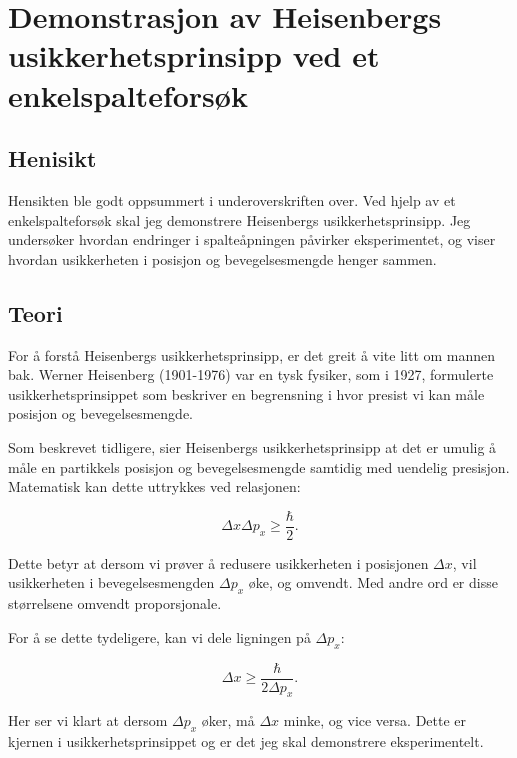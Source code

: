 \documentclass{article}
\begin{document}
\vspace{0.69in}

\section{Demonstrasjon av Heisenbergs usikkerhetsprinsipp ved et enkelspalteforsøk }

\vspace{0.1in}

\subsection{Henisikt}
Hensikten ble godt oppsummert i underoverskriften over. Ved hjelp av et enkelspalteforsøk skal jeg demonstrere Heisenbergs usikkerhetsprinsipp. Jeg undersøker hvordan endringer i spalteåpningen påvirker eksperimentet, og viser hvordan usikkerheten i posisjon og bevegelsesmengde henger sammen.

\vspace{0.2in}

\subsection{Teori}
For å forstå Heisenbergs usikkerhetsprinsipp, er det greit å vite litt om mannen bak. Werner Heisenberg (1901-1976) var en tysk fysiker, som i 1927, formulerte usikkerhetsprinsippet som beskriver en begrensning i hvor presist vi kan måle posisjon og bevegelsesmengde.

Som beskrevet tidligere, sier Heisenbergs usikkerhetsprinsipp at det er umulig å måle en partikkels posisjon og bevegelsesmengde samtidig med uendelig presisjon. Matematisk kan dette uttrykkes ved relasjonen:

\begin{equation*}
    \Delta x \Delta p_x \geq \frac{\hbar}{2}.
\end{equation*}

Dette betyr at dersom vi prøver å redusere usikkerheten i posisjonen $\Delta x$, vil usikkerheten i bevegelsesmengden $\Delta p_x$ øke, og omvendt. Med andre ord er disse størrelsene omvendt proporsjonale. 

For å se dette tydeligere, kan vi dele ligningen på $\Delta p_x$:

\begin{equation*}
    \Delta x \geq \frac{\hbar}{2\Delta p_x}.
\end{equation*}

Her ser vi klart at dersom $\Delta p_x$ øker, må $\Delta x$ minke, og vice versa. Dette er kjernen i usikkerhetsprinsippet og er det jeg skal demonstrere eksperimentelt.  
\end{document}
